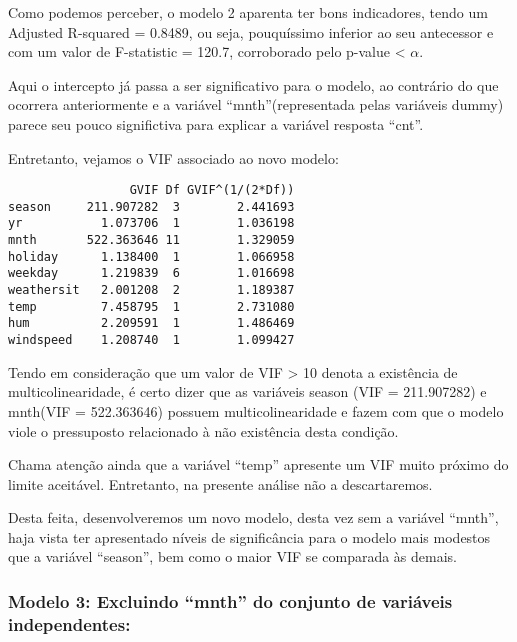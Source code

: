 \documentclass[
  letterpaper,
  DIV=11,
  numbers=noendperiod]{scrartcl}
\begin{document}
Como podemos perceber, o modelo 2 aparenta ter bons indicadores, tendo
um Adjusted R-squared = 0.8489, ou seja, pouquíssimo inferior ao seu
antecessor e com um valor de F-statistic = 120.7, corroborado pelo
p-value \textless{} \(\alpha\).

Aqui o intercepto já passa a ser significativo para o modelo, ao
contrário do que ocorrera anteriormente e a variável
``mnth''(representada pelas variáveis dummy) parece seu pouco
significtiva para explicar a variável resposta ``cnt''.

Entretanto, vejamos o VIF associado ao novo modelo:

\begin{verbatim}
                 GVIF Df GVIF^(1/(2*Df))
season     211.907282  3        2.441693
yr           1.073706  1        1.036198
mnth       522.363646 11        1.329059
holiday      1.138400  1        1.066958
weekday      1.219839  6        1.016698
weathersit   2.001208  2        1.189387
temp         7.458795  1        2.731080
hum          2.209591  1        1.486469
windspeed    1.208740  1        1.099427
\end{verbatim}

Tendo em consideração que um valor de VIF \textgreater{} 10 denota a
existência de multicolinearidade, é certo dizer que as variáveis season
(VIF = 211.907282) e mnth(VIF = 522.363646) possuem multicolinearidade e
fazem com que o modelo viole o pressuposto relacionado à não existência
desta condição.

Chama atenção ainda que a variável ``temp'' apresente um VIF muito
próximo do limite aceitável. Entretanto, na presente análise não a
descartaremos.

Desta feita, desenvolveremos um novo modelo, desta vez sem a variável
``mnth'', haja vista ter apresentado níveis de significância para o
modelo mais modestos que a variável ``season'', bem como o maior VIF se
comparada às demais.

\subsubsection{\texorpdfstring{\textbf{Modelo 3: Excluindo ``mnth'' do
conjunto de variáveis
independentes:}}{Modelo 3: Excluindo ``mnth'' do conjunto de variáveis independentes:}}\label{modelo-3-excluindo-mnth-do-conjunto-de-variuxe1veis-independentes}
\end{document}
